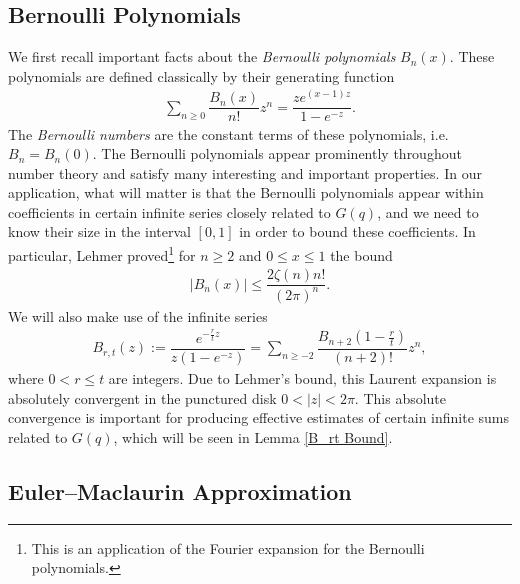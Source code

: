 \documentclass[11pt,reqno]{amsart}
\theoremstyle{definition}
\theoremstyle{plain}
\theoremstyle{named}
\numberwithin{equation}{section}
\theoremstyle{example}
\def\lp{\left(}
\def\rp{\right)}
\begin{document}
\subsection{Bernoulli Polynomials} \label{Bernoulli Section}

We first recall important facts about the {\it Bernoulli polynomials} $B_n(x)$. These polynomials are defined classically by their generating function
\begin{align*}
    \sum_{n \geq 0} \dfrac{B_n(x)}{n!} z^n = \dfrac{z e^{(x-1)z}}{1 - e^{-z}}.
\end{align*}
The {\it Bernoulli numbers} are the constant terms of these polynomials, i.e. $B_n = B_n(0)$. The Bernoulli polynomials appear prominently throughout number theory and satisfy many interesting and important properties. In our application, what will matter is that the Bernoulli polynomials appear within coefficients in certain infinite series closely related to $G(q)$, and we need to know their size in the interval $[0,1]$ in order to bound these coefficients. In particular, Lehmer \cite{Lehmer} proved\footnote{This is an application of the Fourier expansion for the Bernoulli polynomials.} for $n \geq 2$ and $0 \leq x \leq 1$ the bound
\begin{align} \label{Lehmer's Bound}
    \left| B_n(x) \right| \leq \dfrac{2 \zeta(n) n!}{(2\pi)^n}.
\end{align}
We will also make use of the infinite series
\begin{align*}
    B_{r,t}(z) := \dfrac{e^{-\frac rt z}}{z\lp 1 - e^{-z} \rp} = \sum_{n \geq -2} \dfrac{B_{n+2}\lp 1 - \frac rt \rp}{(n+2)!} z^n,
\end{align*}
where $0 < r \leq t$ are integers. Due to Lehmer's bound, this Laurent expansion is absolutely convergent in the punctured disk $0 < |z| < 2\pi$. This absolute convergence is important for producing effective estimates of certain infinite sums related to $G(q)$, which will be seen in Lemma \ref{B_rt Bound}.

\subsection{Euler--Maclaurin Approximation}
\end{document}
